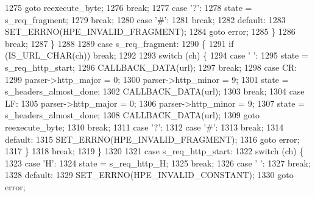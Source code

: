\begin{DoxyCode}
1275             \textcolor{keywordflow}{goto} reexecute\_byte;
1276             \textcolor{keywordflow}{break};
1277           \textcolor{keywordflow}{case} \textcolor{charliteral}{'?'}:
1278             state = s_req_fragment;
1279             \textcolor{keywordflow}{break};
1280           \textcolor{keywordflow}{case} \textcolor{charliteral}{'#'}:
1281             \textcolor{keywordflow}{break};
1282           \textcolor{keywordflow}{default}:
1283             SET_ERRNO(HPE_INVALID_FRAGMENT);
1284             \textcolor{keywordflow}{goto} error;
1285         \}
1286         \textcolor{keywordflow}{break};
1287       \}
1288 
1289       \textcolor{keywordflow}{case} s_req_fragment:
1290       \{
1291         \textcolor{keywordflow}{if} (IS_URL_CHAR(ch)) \textcolor{keywordflow}{break};
1292 
1293         \textcolor{keywordflow}{switch} (ch) \{
1294           \textcolor{keywordflow}{case} \textcolor{charliteral}{' '}:
1295             state = s_req_http_start;
1296             CALLBACK_DATA(url);
1297             \textcolor{keywordflow}{break};
1298           \textcolor{keywordflow}{case} CR:
1299             parser->http_major = 0;
1300             parser->http_minor = 9;
1301             state = s_headers_almost_done;
1302             CALLBACK_DATA(url);
1303             \textcolor{keywordflow}{break};
1304           \textcolor{keywordflow}{case} LF:
1305             parser->http_major = 0;
1306             parser->http_minor = 9;
1307             state = s_headers_almost_done;
1308             CALLBACK_DATA(url);
1309             \textcolor{keywordflow}{goto} reexecute\_byte;
1310             \textcolor{keywordflow}{break};
1311           \textcolor{keywordflow}{case} \textcolor{charliteral}{'?'}:
1312           \textcolor{keywordflow}{case} \textcolor{charliteral}{'#'}:
1313             \textcolor{keywordflow}{break};
1314           \textcolor{keywordflow}{default}:
1315             SET_ERRNO(HPE_INVALID_FRAGMENT);
1316             \textcolor{keywordflow}{goto} error;
1317         \}
1318         \textcolor{keywordflow}{break};
1319       \}
1320 
1321       \textcolor{keywordflow}{case} s_req_http_start:
1322         \textcolor{keywordflow}{switch} (ch) \{
1323           \textcolor{keywordflow}{case} \textcolor{charliteral}{'H'}:
1324             state = s_req_http_H;
1325             \textcolor{keywordflow}{break};
1326           \textcolor{keywordflow}{case} \textcolor{charliteral}{' '}:
1327             \textcolor{keywordflow}{break};
1328           \textcolor{keywordflow}{default}:
1329             SET_ERRNO(HPE_INVALID_CONSTANT);
1330             \textcolor{keywordflow}{goto} error;

\end{DoxyCode}
